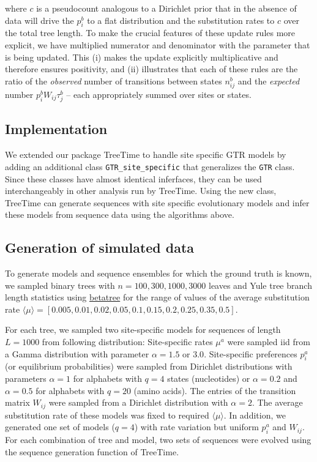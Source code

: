 \documentclass[aps,rmp,twocolumn]{revtex4}
\newcommand{\eqp}{p}
\newcommand{\pc}{c}
\begin{document}
where $\pc$ is a pseudocount analogous to a Dirichlet prior that in the absence of data will drive the $\eqp_i^b$ to a flat distribution and the substitution rates to $\pc$ over the total tree length.
To make the crucial features of these update rules more explicit, we have multiplied numerator and denominator with the parameter that is being updated. This (i) makes the update explicitly multiplicative and therefore ensures positivity, and (ii) illustrates that each of these rules are the ratio of the {\it observed} number of transitions between states $n^b_{ij}$ and the {\it expected} number $\eqp^b_i W_{ij}\tau_j^b$ -- each appropriately summed over sites or states.

\subsection*{Implementation}
We extended our package TreeTime \citep{sagulenko2017treetime} to handle site specific GTR models by adding an additional class \texttt{GTR\_site\_specific} that generalizes the \texttt{GTR} class.
Since these classes have almost identical inferfaces, they can be used interchangeably in other analysis run by TreeTime.
Using the new class, TreeTime can generate sequences with site specific evolutionary models and infer these models from sequence data using the algorithms above.



\subsection*{Generation of simulated data}
To generate models and sequence ensembles for which the ground truth is known, we sampled binary trees with $n=100, 300, 1000, 3000$ leaves and Yule tree branch length statistics using \href{https://github.com/neherlab/betatree}{betatree} \citep{neher2013coalescence} for the range of values of the average substitution rate $\langle \mu\rangle = [0.005, 0.01, 0.02, 0.05, 0.1, 0.15, 0.2, 0.25, 0.35, 0.5]$.

For each tree, we sampled two site-specific models for sequences of length $L=1000$ from following distribution:
Site-specific rates $\mu^a$ were sampled iid from a Gamma distribution with parameter $\alpha=1.5$ or $3.0$.
Site-specific preferences $\eqp_i^a$ (or equilibrium probabilities) were sampled from Dirichlet distributions with parameters $\alpha=1$ for alphabets with $q=4$ states (nucleotides) or $\alpha=0.2$ and $\alpha=0.5$ for alphabets with $q=20$ (amino acids).
The entries of the transition matrix $W_{ij}$ were sampled from a Dirichlet distribution with $\alpha=2$.
The average substitution rate of these models was fixed to required $\langle \mu\rangle$.
In addition, we generated one set of models ($q=4$) with rate variation but uniform $\eqp_i^a$ and $W_{ij}$.
For each combination of tree and model, two sets of sequences were evolved using the sequence generation function of TreeTime.
\end{document}
